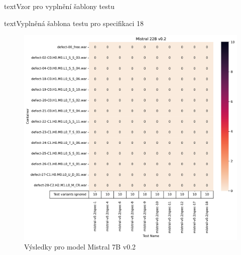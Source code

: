 \documentclass[czech, ma, kiv, he, iso690numb, pdf, viewonly]{fasthesis}
\begin{document}
\begin{code}{text}{Vzor pro vyplnění šablony testu \label{lst:template}}
{\begin{code}{text}{Vyplněná šablona testu pro specifikaci 18 \label{lst:spec18}}
{        \begin{figure}
            \includegraphics[width=\textwidth]{pic/mistral-v0.2-res.pdf}
            \caption{Výsledky pro model Mistral 7B v0.2}
            \label{fig:res:mistral-7b}
        \end{figure}

}
\end{code}}
\end{code}
\end{document}
